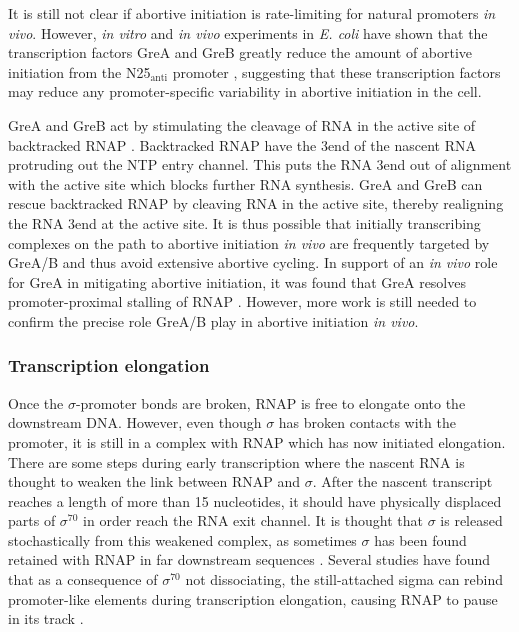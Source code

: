 It is still not clear if abortive initiation is rate-limiting for natural
promoters \textit{in vivo}. However, \textit{in vitro} and \textit{in vivo}
experiments in \textit{E. coli} have shown that the transcription factors GreA
and GreB greatly reduce the amount of abortive initiation from the
N25$_{\text{anti}}$ promoter \cite{hsu_escherichia_1995}, suggesting that these
transcription factors may reduce any promoter-specific variability in abortive
initiation in the cell.

GreA and GreB act by stimulating the cleavage of RNA in the active site of
backtracked RNAP \cite{toulme_grea_2000}. Backtracked RNAP have the 3\p end of
the nascent RNA protruding out the NTP entry channel. This puts the RNA 3\p end
out of alignment with the active site which blocks further RNA synthesis.
GreA and GreB can rescue backtracked RNAP by cleaving RNA in the active site,
thereby realigning the RNA 3\p end at the active site. It is thus possible that
initially transcribing complexes on the path to abortive initiation \textit{in
vivo} are frequently targeted by GreA/B and thus avoid extensive abortive
cycling. In support of an \textit{in vivo} role for GreA in mitigating
abortive initiation, it was found that GreA resolves promoter-proximal stalling
of RNAP \cite{kusuya_transcription_2011}. However, more work is still needed
to confirm the precise role GreA/B play in abortive initiation \textit{in
vivo}.

\subsubsection{Transcription elongation}
Once the $\sigma$-promoter bonds are broken, RNAP is free to elongate onto the
downstream DNA. However, even though $\sigma$ has broken contacts with the
promoter, it is still in a complex with RNAP which has now initiated
elongation. There are some steps during early transcription where the nascent
RNA is thought to weaken the link between RNAP and $\sigma$. After the nascent
transcript reaches a length of more than 15 nucleotides, it should have
physically displaced parts of $\sigma^{70}$ \cite{mekler_structural_2002,
nickels_interaction_2005} in order reach the RNA exit channel. It is thought
that $\sigma$ is released stochastically from this weakened complex, as
sometimes $\sigma$ has been found retained with RNAP in far downstream sequences
\cite{mooney_sigma_2005}. Several studies have found that as a consequence of
$\sigma^{70}$ not dissociating, the still-attached sigma can rebind
promoter-like elements during transcription elongation, causing RNAP to pause
in its track \cite{ring_function_1996, kapanidis_retention_2005,
raffaelle_holoenzyme_2005}.

